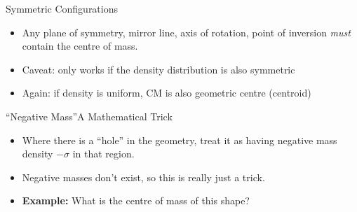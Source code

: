 \documentclass[12pt,compress,aspectratio=169]{beamer}
\begin{document}
\begin{frame}{Symmetric Configurations}
  \begin{itemize}
  \item Any plane of symmetry, mirror line, axis of rotation, point of inversion
    \emph{must} contain the centre of mass.
  \item Caveat: only works if the density distribution is also symmetric
  \item Again: if density is uniform, CM is also geometric centre (centroid)
  \end{itemize}
\end{frame}



\begin{frame}{``Negative Mass''}{A Mathematical Trick}
  \begin{itemize}
  \item Where there is a ``hole'' in the geometry, treat it as having negative
    mass density $-\sigma$ in that region.
  \item Negative masses don't exist, so this is really just a trick.
  \item\textbf{Example:} What is the centre of mass of this shape?
    \begin{center}
    \end{center}
  \end{itemize}
\end{frame}
\end{document}
